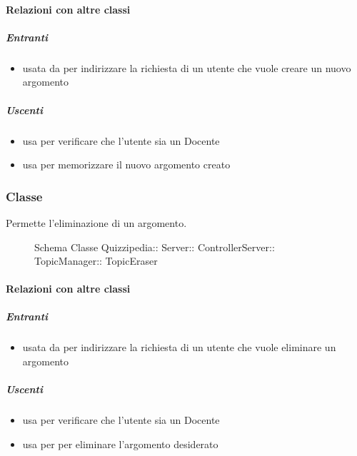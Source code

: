\paragraph{Relazioni con altre classi}
\subparagraph{Entranti}
\begin{itemize}
\item usata da  per indirizzare la richiesta di un utente che vuole creare un nuovo argomento
\end{itemize}
\subparagraph{Uscenti}
\begin{itemize}
\item usa  per verificare che l'utente sia un Docente
\item usa  per memorizzare il nuovo argomento creato
\end{itemize}
\subsubsection{Classe }
Permette l'eliminazione di un argomento.
\begin{figure}[H]
\centering
\noindent{}
\caption[Schema Classe TopicEraser]{Schema Classe Quizzipedia:: Server:: ControllerServer:: TopicManager:: TopicEraser}
\end{figure}
\paragraph{Relazioni con altre classi}
\subparagraph{Entranti}
\begin{itemize}
\item usata da  per indirizzare la richiesta di un utente che vuole eliminare un argomento
\end{itemize}
\subparagraph{Uscenti}
\begin{itemize}
\item usa  per verificare che l'utente sia un Docente
\item usa  per per eliminare l'argomento desiderato
\end{itemize}

